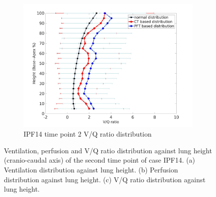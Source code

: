 \begin{figure}[htbp]
\begin{subfigure}{.6\linewidth}
  \includegraphics[width=\linewidth,trim={{.0\wd0} {.0\wd0} {.0\wd0} {.0\wd0}},clip]{Appendix/Image_AppexB/IPF1402/IPF1402_VQAgainstLungHeight.jpg}
  \caption{IPF14 time point 2 V/Q ratio distribution}
  \label{fig:IPF1402VQDistribution-c}
\end{subfigure}
\caption{ Ventilation, perfusion and V/Q ratio distribution against lung height (cranio-caudal axis) of the second time point of case IPF14. (a) Ventilation distribution against lung height. (b) Perfusion distribution against lung height. (c) V/Q ratio distribution against lung height.}
\label{fig:IPF1402VQDistribution}
\end{figure}